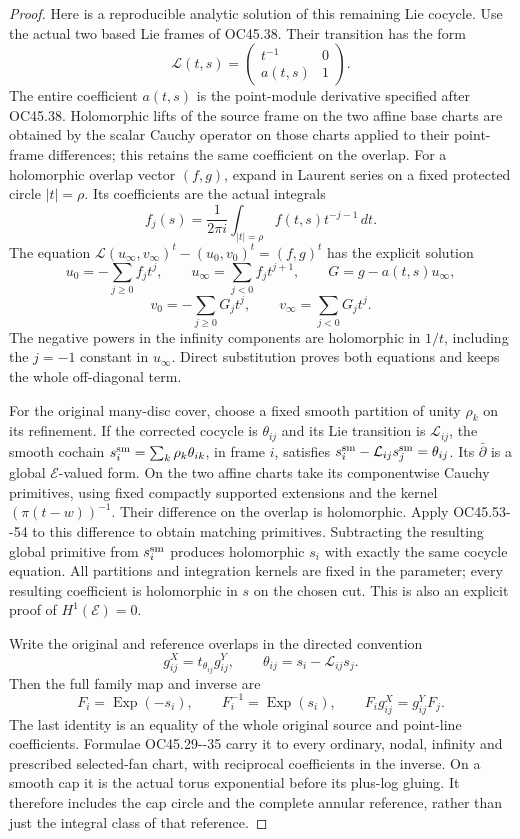 \begin{proof}
Here is a reproducible analytic solution of this remaining
Lie cocycle. Use the actual two based Lie frames of OC45.38.
Their transition has the form
\[
 \mathcal L(t,s)=
     \begin{pmatrix}t^{-1}&0\\a(t,s)&1\end{pmatrix}.
 \tag{OC45.51}
\]
The entire coefficient \(a(t,s)\) is the point-module derivative
specified after OC45.38. Holomorphic lifts of the source frame
on the two affine base charts are obtained by the scalar Cauchy
operator on those charts applied to their point-frame differences;
this retains the same coefficient on the overlap.
For a holomorphic overlap vector \((f,g)\), expand in Laurent
series on a fixed protected circle \(|t|=\rho\). Its coefficients
are the actual integrals
\[
 f_j(s)=\frac1{2\pi i}\int_{|t|=\rho}f(t,s)t^{-j-1}\,dt .
 \tag{OC45.52}
\]
The equation
\(\mathcal L(u_\infty,v_\infty)^t-(u_0,v_0)^t=(f,g)^t\)
has the explicit solution
\[
 u_0=-\sum_{j\ge0}f_jt^j,\qquad
 u_\infty=\sum_{j<0}f_jt^{j+1},\qquad
 G=g-a(t,s)u_\infty,
 \tag{OC45.53}
\]
\[
 v_0=-\sum_{j\ge0}G_jt^j,\qquad
 v_\infty=\sum_{j<0}G_jt^j.
 \tag{OC45.54}
\]
The negative powers in the infinity components are holomorphic
in \(1/t\), including the \(j=-1\) constant in \(u_\infty\).
Direct substitution proves both equations and keeps the whole
off-diagonal term.

For the original many-disc cover, choose a fixed smooth partition
of unity \(\rho_k\) on its refinement. If the corrected cocycle is
\(\theta_{ij}\) and its Lie transition is \(\mathcal L_{ij}\),
the smooth cochain
\(s_i^{\rm sm}=\sum_k\rho_k\theta_{ik}\), in frame \(i\),
satisfies \(s_i^{\rm sm}-\mathcal L_{ij}s_j^{\rm sm}=\theta_{ij}\).
Its \(\bar\partial\) is a global \(\mathscr E\)-valued form.
On the two affine charts take its componentwise Cauchy primitives,
using fixed compactly supported extensions and the kernel
\((\pi(t-w))^{-1}\). Their difference on the overlap is holomorphic.
Apply OC45.53-\/-54 to this difference to obtain matching primitives.
Subtracting the resulting global primitive from \(s_i^{\rm sm}\)
produces holomorphic \(s_i\) with exactly the same cocycle equation.
All partitions and integration kernels are fixed in the parameter;
every resulting coefficient is holomorphic in \(s\) on the
chosen cut. This is also an explicit proof of \(H^1(\mathscr E)=0\).

Write the original and reference overlaps in the directed convention
\[
 g^X_{ij}=t_{\theta_{ij}}g^Y_{ij},\qquad
 \theta_{ij}=s_i-\mathcal L_{ij}s_j.
 \tag{OC45.55}
\]
Then the full family map and inverse are
\[
 F_i=\operatorname{Exp}(-s_i),\qquad F_i^{-1}=\operatorname{Exp}(s_i),
 \qquad F_i g^X_{ij}=g^Y_{ij}F_j.
 \tag{OC45.56}
\]
The last identity is an equality of the whole original source
and point-line coefficients. Formulae OC45.29-\/-35 carry it to
every ordinary, nodal, infinity and prescribed selected-fan
chart, with reciprocal coefficients in the inverse. On a
smooth cap it is the actual torus exponential before its
plus-log gluing. It therefore includes the cap circle and
the complete annular reference, rather than just the integral
class of that reference.


\end{proof}

